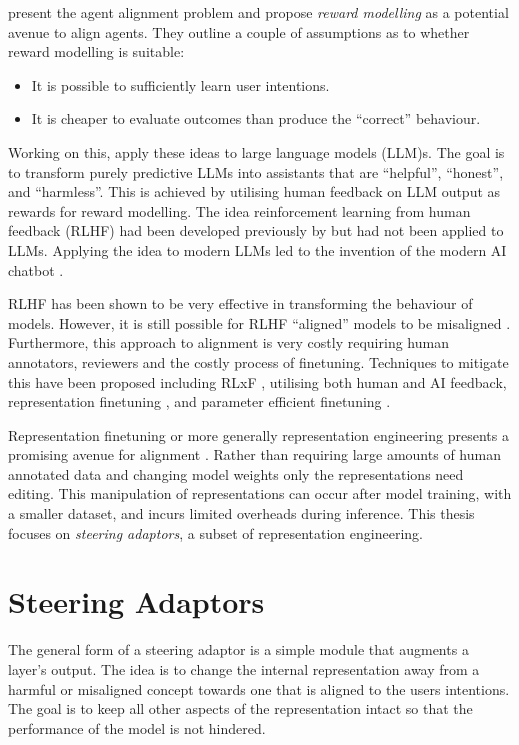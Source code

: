 \citet{agent-alignment} present the agent alignment problem and propose \emph{reward modelling} as a potential avenue to align agents.
They outline a couple of assumptions as to whether reward modelling is suitable:
\begin{itemize}[nolistsep]
    \item It is possible to sufficiently learn user intentions.
    \item It is cheaper to evaluate outcomes than produce the ``correct'' behaviour.
\end{itemize}
Working on this, \citet{rlhf} apply these ideas to large language models (LLM)s.
The goal is to transform purely predictive LLMs into assistants that are ``helpful'', ``honest'', and ``harmless''.
This is achieved by utilising human feedback on LLM output as rewards for reward modelling.
The idea reinforcement learning from human feedback (RLHF) had been developed previously by \citet{rlhf-orig} but had not been applied to LLMs.
Applying the idea to modern LLMs led to the invention of the modern AI chatbot \citep{chatgpt}.

RLHF has been shown to be very effective in transforming the behaviour of models.
However, it is still possible for RLHF ``aligned'' models to be misaligned \citep{misgeneralization, c.ai}.
Furthermore, this approach to alignment is very costly requiring human annotators, reviewers and the costly process of finetuning.
Techniques to mitigate this have been proposed including RLxF \citep{alignment-survey}, utilising both human and AI feedback, representation finetuning \citep{reft}, and parameter efficient finetuning \citep{peft}.

Representation finetuning or more generally representation engineering \citep{steering-taxonomy} presents a promising avenue for alignment \citep{steering-clear, steering-theory, steering-taxonomy}.
Rather than requiring large amounts of human annotated data and changing model weights only the representations need editing.
This manipulation of representations can occur after model training, with a smaller dataset, and incurs limited overheads during inference.
This thesis focuses on \emph{steering adaptors}, a subset of representation engineering.

\section{Steering Adaptors}

The general form of a steering adaptor is a simple module that augments a layer's output.
The idea is to change the internal representation away from a harmful or misaligned concept towards one that is aligned to the users intentions.
The goal is to keep all other aspects of the representation intact so that the performance of the model is not hindered.

